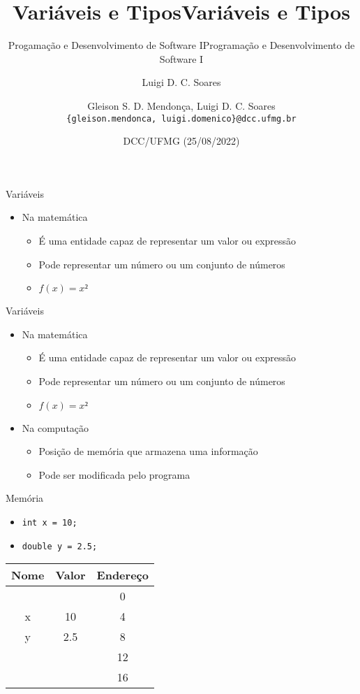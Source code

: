 \documentclass[t, aspectratio=169]{beamer}
\author{Luigi D. C. Soares}
\date{DCC/UFMG (25/08/2022)}
\title{Variáveis e Tipos}
\subtitle{Progamação e Desenvolvimento de Software I}
\title[Variáveis e Tipos]{Variáveis e Tipos}
\subtitle{Programação e Desenvolvimento de Software I}
\author[\tiny\{gleison.mendonca, luigi.domenico\}@dcc.ufmg.br]{%
Gleison S. D. Mendonça, Luigi D. C. Soares\texorpdfstring{\\}{}
\texttt{\{gleison.mendonca, luigi.domenico\}@dcc.ufmg.br}}
\institute[DCC/UFMG]{}
\date[25/08/2022]{}
\begin{document}
\maketitle

\begin{frame}[label={sec:org8463d7a}]{Variáveis}
\begin{itemize}
\item Na matemática
\begin{itemize}
\item É uma entidade capaz de representar um valor ou expressão
\item Pode representar um número ou um conjunto de números
\item \(f(x) = x²\)
\end{itemize}
\end{itemize}
\end{frame}

\begin{frame}[label={sec:org4ab6ca1}]{Variáveis}
\begin{itemize}
\item Na matemática
\begin{itemize}
\item É uma entidade capaz de representar um valor ou expressão
\item Pode representar um número ou um conjunto de números
\item \(f(x) = x²\)
\end{itemize}

\item Na computação
\begin{itemize}
\item Posição de memória que armazena uma informação
\item Pode ser modificada pelo programa
\end{itemize}
\end{itemize}
\end{frame}

\begin{frame}[label={sec:org8298b02},fragile]{Memória}
 \begin{itemize}
\item \texttt{int x = 10;}
\item \texttt{double y = 2.5;}
\end{itemize}

\begin{center}
\begin{tabular}{ccc}
\toprule
Nome & \alert{Valor} & \alert{Endereço}\\
\midrule
 &  & 0\\
x & 10 & 4\\
y & 2.5 & 8\\
 &  & 12\\
 &  & 16\\
\bottomrule
\end{tabular}
\end{center}
\end{frame}
\end{document}
